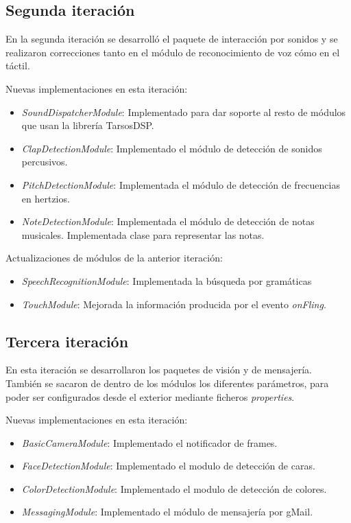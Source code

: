 \subsection{Segunda iteración}
En la segunda iteración se desarrolló el paquete de interacción por sonidos y se realizaron correcciones tanto en el módulo de reconocimiento de voz cómo en el táctil.

Nuevas implementaciones en esta iteración:

\begin{itemize}
	\item \textit{SoundDispatcherModule}: Implementado para dar soporte al resto de módulos que usan la librería TarsosDSP\cite{six2014tarsosdsp}.
	\item \textit{ClapDetectionModule}: Implementado el módulo de detección de sonidos percusivos.
	\item \textit{PitchDetectionModule}: Implementada el módulo de detección de frecuencias en hertzios.
	\item \textit{NoteDetectionModule}: Implementada el módulo de detección de notas musicales. Implementada clase para representar las notas.
\end{itemize}

Actualizaciones de módulos de la anterior iteración:

\begin{itemize}
	\item \textit{SpeechRecognitionModule}: Implementada la búsqueda por gramáticas
	\item \textit{TouchModule}: Mejorada la información producida por el evento \textit{onFling}.
\end{itemize}

\subsection{Tercera iteración}

En esta iteración se desarrollaron los paquetes de visión y de mensajería. También se sacaron de dentro de los módulos los diferentes parámetros, para poder ser configurados desde el exterior mediante ficheros \textit{properties}.

Nuevas implementaciones en esta iteración:

\begin{itemize}
	\item \textit{BasicCameraModule}: Implementado el notificador de frames.
	\item \textit{FaceDetectionModule}: Implementado el modulo de detección de caras.
	\item \textit{ColorDetectionModule}: Implementado el modulo de detección de colores.
	\item \textit{MessagingModule}: Implementado el módulo de mensajería por gMail.
\end{itemize}

